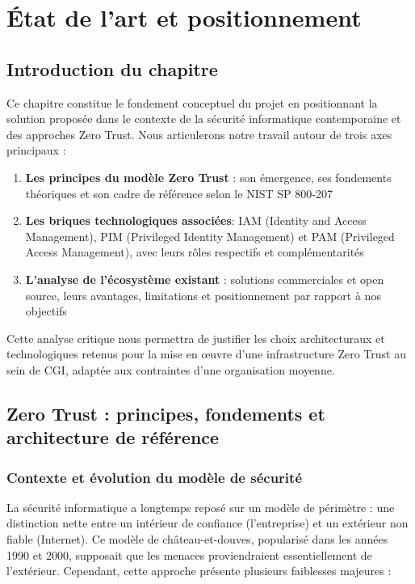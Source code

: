 \chapter{État de l'art et positionnement}

\section{Introduction du chapitre}

Ce chapitre constitue le fondement conceptuel du projet en positionnant la solution proposée dans le contexte de la sécurité informatique contemporaine et des approches Zero Trust. Nous articulerons notre travail autour de trois axes principaux :

\begin{enumerate}
    \item \textbf{Les principes du modèle Zero Trust} : son émergence, ses fondements théoriques et son cadre de référence selon le NIST SP 800-207
    \item \textbf{Les briques technologiques associées}: IAM (Identity and Access Management), PIM (Privileged Identity Management) et PAM (Privileged Access Management), avec leurs rôles respectifs et complémentarités
    \item \textbf{L'analyse de l'écosystème existant} : solutions commerciales et open source, leurs avantages, limitations et positionnement par rapport à nos objectifs
\end{enumerate}

Cette analyse critique nous permettra de justifier les choix architecturaux et technologiques retenus pour la mise en œuvre d'une infrastructure Zero Trust au sein de CGI, adaptée aux contraintes d'une organisation moyenne.

\section{Zero Trust : principes, fondements et architecture de référence}

\subsection{Contexte et évolution du modèle de sécurité}

La sécurité informatique a longtemps reposé sur un modèle de périmètre : une distinction nette entre un intérieur de confiance (l'entreprise) et un extérieur non fiable (Internet). Ce modèle de château-et-douves, popularisé dans les années 1990 et 2000, supposait que les menaces proviendraient essentiellement de l'extérieur. Cependant, cette approche présente plusieurs faiblesses majeures :

